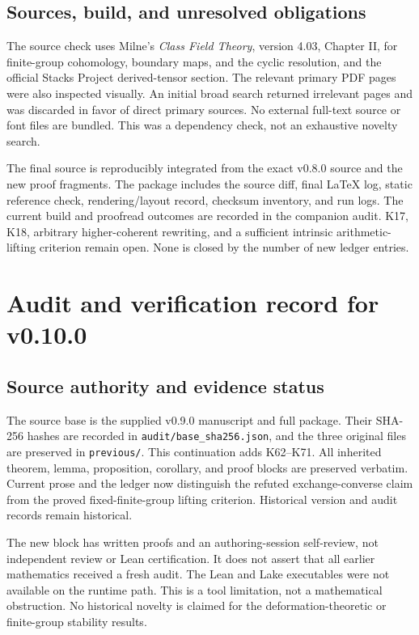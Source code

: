 \documentclass[11pt]{article}
\theoremstyle{definition}
\theoremstyle{remark}
\begin{document}
\subsection{Sources, build, and unresolved obligations}
The source check uses Milne's \emph{Class Field Theory}, version 4.03, Chapter II, for finite-group cohomology, boundary maps, and the cyclic resolution, and the official Stacks Project derived-tensor section. The relevant primary PDF pages were also inspected visually. An initial broad search returned irrelevant pages and was discarded in favor of direct primary sources. No external full-text source or font files are bundled. This was a dependency check, not an exhaustive novelty search.

The final source is reproducibly integrated from the exact v0.8.0 source and the new proof fragments. The package includes the source diff, final LaTeX log, static reference check, rendering/layout record, checksum inventory, and run logs. The current build and proofread outcomes are recorded in the companion audit. K17, K18, arbitrary higher-coherent rewriting, and a sufficient intrinsic arithmetic-lifting criterion remain open. None is closed by the number of new ledger entries.


\clearpage
\section{Audit and verification record for v0.10.0}\label{app:audit-v0100}

\subsection{Source authority and evidence status}
The source base is the supplied v0.9.0 manuscript and full package. Their SHA-256 hashes are recorded in \texttt{audit/base\_sha256.json}, and the three original files are preserved in \texttt{previous/}. This continuation adds K62--K71. All inherited theorem, lemma, proposition, corollary, and proof blocks are preserved verbatim. Current prose and the ledger now distinguish the refuted exchange-converse claim from the proved fixed-finite-group lifting criterion. Historical version and audit records remain historical.

The new block has written proofs and an authoring-session self-review, not independent review or Lean certification. It does not assert that all earlier mathematics received a fresh audit. The Lean and Lake executables were not available on the runtime path. This is a tool limitation, not a mathematical obstruction. No historical novelty is claimed for the deformation-theoretic or finite-group stability results.
\end{document}
